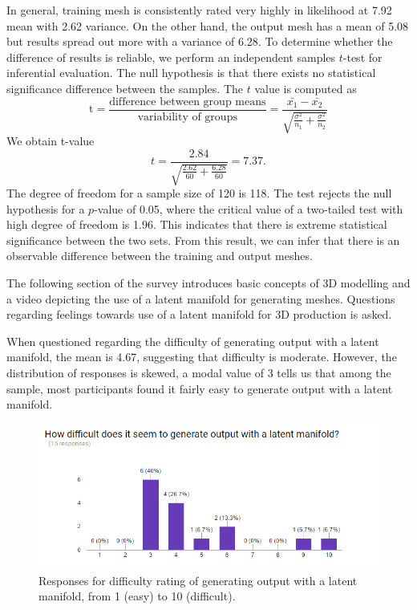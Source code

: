 \documentclass[ %
author={Dillon Keith Diep},
supervisor={Dr. Carl Henrik Ek},
degree={MEng},
title={ART-CG Hair:},
subtitle={Assisted Real-time Content Generation of Stylised Virtual Hair},
type={Research},
year={2017} ]{dissertation}
\begin{document}
In general, training mesh is consistently rated very highly in likelihood at 7.92 mean with 2.62 variance. On the other hand, the output mesh has a mean of 5.08 but results spread out more with a variance of 6.28. To determine whether the difference of results is reliable, we perform an independent samples $t$-test for inferential evaluation. The null hypothesis is that there exists no statistical significance difference between the samples. The $t$ value is computed as
$$\text{t}=\frac{\text{difference between group means}}{\text{variability of groups}}=\frac{\bar{x_1}-\bar{x_2}}{\sqrt{\frac{\sigma^2}{n_1}+\frac{\sigma^2}{n_2}}}$$
We obtain t-value
$$t = \frac{2.84}{\sqrt{\frac{2.62}{60}+\frac{6.28}{60}}}=7.37.$$
The degree of freedom for a sample size of 120 is 118. The test rejects the null hypothesis for a $p$-value of 0.05, where the critical value of a two-tailed test with high degree of freedom is 1.96. This indicates that there is extreme statistical significance between the two sets. From this result, we can infer that there is an observable difference between the training and output meshes.

The following section of the survey introduces basic concepts of 3D modelling and a video depicting the use of a latent manifold for generating meshes. Questions regarding feelings towards use of a latent manifold for 3D production is asked.

When questioned regarding the difficulty of generating output with a latent manifold, the mean is 4.67, suggesting that difficulty is moderate. However, the distribution of responses is skewed, a modal value of 3 tells us that among the sample, most participants found it fairly easy to generate output with a latent manifold.
\begin{figure}[!h]
	\centering
	\caption{Responses for difficulty rating of generating output with a latent manifold, from 1 (easy) to 10 (difficult).}
	\includegraphics[scale=0.7]{images/surveyDifficulty}
\end{figure}
\end{document}
